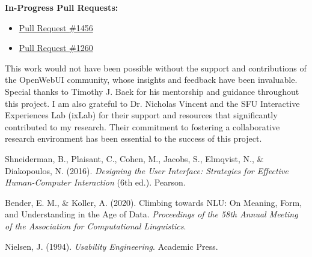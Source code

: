 \documentclass[sigconf, nonacm]{acmart}
\begin{document}
\textbf{In-Progress Pull Requests:}
\begin{itemize}
    \item \href{https://github.com/open-webui/open-webui/pull/1456}{Pull Request \#1456}
    \item \href{https://github.com/open-webui/open-webui/pull/1260}{Pull Request \#1260}
\end{itemize}

\begin{acks}
This work would not have been possible without the support and contributions of the OpenWebUI community, whose insights and feedback have been invaluable. Special thanks to Timothy J. Baek for his mentorship and guidance throughout this project. I am also grateful to Dr. Nicholas Vincent and the SFU Interactive Experiences Lab (ixLab) for their support and resources that significantly contributed to my research. Their commitment to fostering a collaborative research environment has been essential to the success of this project.
\end{acks}

\begin{thebibliography}{}

Shneiderman, B., Plaisant, C., Cohen, M., Jacobs, S., Elmqvist, N., \& Diakopoulos, N. (2016). \textit{Designing the User Interface: Strategies for Effective Human-Computer Interaction} (6th ed.). Pearson.

Bender, E. M., \& Koller, A. (2020). Climbing towards NLU: On Meaning, Form, and Understanding in the Age of Data. \textit{Proceedings of the 58th Annual Meeting of the Association for Computational Linguistics}.

Nielsen, J. (1994). \textit{Usability Engineering}. Academic Press.

\end{thebibliography}
\end{document}
